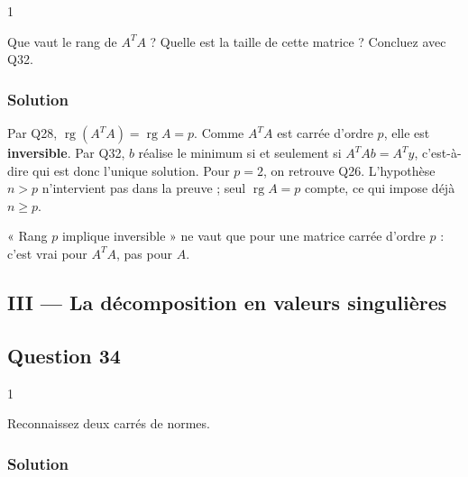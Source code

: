 \documentclass[11pt,a4paper]{article}
\newcommand{\equationajustee}[1]{%
  \sbox{\boiteequation}{$\displaystyle #1$}%
  \ifdim\wd\boiteequation>\linewidth
    \[\resizebox{\linewidth}{!}{\usebox{\boiteequation}}\]%
  \else
    \[#1\]%
  \fi}
\begin{document}
\begin{indication}{1}

Que vaut le rang de \(A^TA\) ? Quelle est la taille de cette matrice ? Concluez avec Q32.

\end{indication}

\hypertarget{solution-32}{%
\subsubsection{Solution}\label{solution-32}}

Par Q28, \(\operatorname{rg}(A^TA)=\operatorname{rg}A=p\). Comme \(A^TA\) est carrée d'ordre \(p\), elle est \textbf{inversible}. Par Q32, \(b\) réalise le minimum si et seulement si \(A^TAb=A^Ty\), c'est-à-dire
\equationajustee{\boxed{b=(A^TA)^{-1}A^Ty,}}
qui est donc l'unique solution. Pour \(p=2\), on retrouve Q26. L'hypothèse \(n>p\) n'intervient pas dans la preuve ; seul \(\operatorname{rg}A=p\) compte, ce qui impose déjà \(n\geqslant p\).

\begin{piege}

« Rang \(p\) implique inversible » ne vaut que pour une matrice carrée d'ordre \(p\) : c'est vrai pour \(A^TA\), pas pour \(A\).

\end{piege}

\hypertarget{iii-la-duxe9composition-en-valeurs-singuliuxe8res}{%
\subsection{III --- La décomposition en valeurs singulières}\label{iii-la-duxe9composition-en-valeurs-singuliuxe8res}}

\hypertarget{question-34}{%
\subsection{Question 34}\label{question-34}}

\begin{indication}{1}

Reconnaissez deux carrés de normes.

\end{indication}

\hypertarget{solution-33}{%
\subsubsection{Solution}\label{solution-33}}
\end{document}
